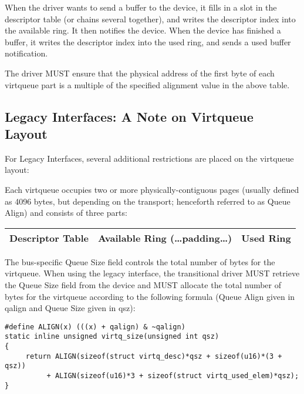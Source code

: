 When the driver wants to send a buffer to the device, it fills in
a slot in the descriptor table (or chains several together), and
writes the descriptor index into the available ring.  It then
notifies the device. When the device has finished a buffer, it
writes the descriptor index into the used ring, and sends a
used buffer notification.

The driver MUST ensure that the physical address of the first byte
of each virtqueue part is a multiple of the specified alignment value
in the above table.

\subsection{Legacy Interfaces: A Note on Virtqueue Layout}\label{sec:Basic Facilities of a Virtio Device / Virtqueues / Legacy Interfaces: A Note on Virtqueue Layout}

For Legacy Interfaces, several additional
restrictions are placed on the virtqueue layout:

Each virtqueue occupies two or more physically-contiguous pages
(usually defined as 4096 bytes, but depending on the transport;
henceforth referred to as Queue Align)
and consists of three parts:

\begin{tabular}{|l|l|l|}
\hline
Descriptor Table & Available Ring (\ldots padding\ldots) & Used Ring \\
\hline
\end{tabular}

The bus-specific Queue Size field controls the total number of bytes
for the virtqueue.
When using the legacy interface, the transitional
driver MUST retrieve the Queue Size field from the device
and MUST allocate the total number of bytes for the virtqueue
according to the following formula (Queue Align given in qalign and
Queue Size given in qsz):

\begin{lstlisting}
#define ALIGN(x) (((x) + qalign) & ~qalign)
static inline unsigned virtq_size(unsigned int qsz)
{
     return ALIGN(sizeof(struct virtq_desc)*qsz + sizeof(u16)*(3 + qsz))
          + ALIGN(sizeof(u16)*3 + sizeof(struct virtq_used_elem)*qsz);
}
\end{lstlisting}

